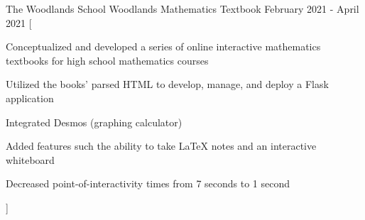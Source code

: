 

\begin{cventries}

  \cventry
    {The Woodlands School} %
    {Woodlands Mathematics Textbook} %
    {} %
    {February 2021 - April 2021} %
    [
      \begin{cvitems} %
        \item {Conceptualized and developed a series of online interactive mathematics textbooks for high school mathematics courses}
        \item {Utilized the books' parsed HTML to develop, manage, and deploy a Flask application}
        \item {Integrated Desmos (graphing calculator)}
        \item {Added features such the ability to take LaTeX notes and an interactive whiteboard}
        \item {Decreased point-of-interactivity times from 7 seconds to 1 second}
      \end{cvitems}
    ]

\end{cventries}
